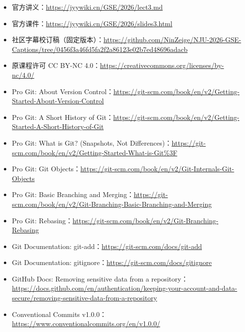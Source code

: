 \documentclass[UTF8,a4paper,11pt,fontset=fandol]{ctexart}
\begin{document}
\begin{itemize}

\item 官方讲义：\url{https://jyywiki.cn/GSE/2026/lect3.md}

\item 官方课件：\url{https://jyywiki.cn/GSE/2026/slides3.html}

\item 社区字幕校订稿（固定版本）：\url{https://github.com/NinZeige/NJU-2026-GSE-Captions/tree/0456f3a46fd5fa2f2a86123e02b7ed48696adacb}

\item 原课程许可 CC BY-NC 4.0：\url{https://creativecommons.org/licenses/by-nc/4.0/}

\item Pro Git: About Version Control：\url{https://git-scm.com/book/en/v2/Getting-Started-About-Version-Control}

\item Pro Git: A Short History of Git：\url{https://git-scm.com/book/en/v2/Getting-Started-A-Short-History-of-Git}

\item Pro Git: What is Git? (Snapshots, Not Differences)：\url{https://git-scm.com/book/en/v2/Getting-Started-What-is-Git%3F}

\item Pro Git: Git Objects：\url{https://git-scm.com/book/en/v2/Git-Internals-Git-Objects}

\item Pro Git: Basic Branching and Merging：\url{https://git-scm.com/book/en/v2/Git-Branching-Basic-Branching-and-Merging}

\item Pro Git: Rebasing：\url{https://git-scm.com/book/en/v2/Git-Branching-Rebasing}

\item Git Documentation: git-add：\url{https://git-scm.com/docs/git-add}

\item Git Documentation: gitignore：\url{https://git-scm.com/docs/gitignore}

\item GitHub Docs: Removing sensitive data from a repository：\url{https://docs.github.com/en/authentication/keeping-your-account-and-data-secure/removing-sensitive-data-from-a-repository}

\item Conventional Commits v1.0.0：\url{https://www.conventionalcommits.org/en/v1.0.0/}


\end{itemize}
\end{document}
